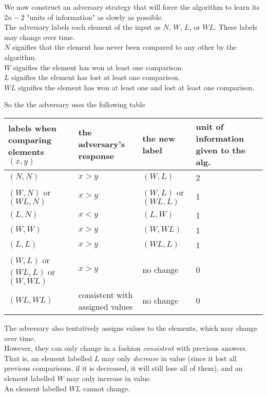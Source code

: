 \documentclass[12pt]{article}
\theoremstyle{plain}
\theoremstyle{definition}
\newcommand{\lecture}[1]{\marginpar{{\footnotesize $\leftarrow$ \underline{#1}}}}
\begin{document}
We now construct an adversary strategy that will force the algorithm to learn its $2n-2$ "units of information" as slowly as possible. \\
The adversary labels each element of the input as $N$, $W$, $L$, or $WL$.
These labels may change over time. \\
$N$ signifies that the element has never been compared to any other by the algorithm. \\
$W$ signifies the element has won at least one comparison. \\
$L$ signifies the element has lost at least one comparison. \\
$WL$ signifies the element has won at least one and lost at least one comparison. \\

\lecture{October 27, 2016}

So the the adversary uses the following table
\begin{table}[h]
  \centering
  \begin{tabular}{C{3cm}  C{3cm}  C{3cm}  C{3cm}}
  \hline
  labels when comparing elements $(x, y)$ & the adversary's response & the new label & unit of information given to the alg. \\ \hline
  $(N, N)$ & $x > y$ & $(W, L)$ & 2 \\
  $(W, N)$ or $(WL, N)$ & $x > y$ & $(W, L)$ or $(WL, L)$ & 1 \\
  $(L, N)$ & $x < y$ & $(L, W)$ & 1 \\
  $(W, W)$ & $x > y$ & $(W, WL)$ & 1 \\
  $(L, L)$ & $x > y$ & $(WL, L)$ & 1 \\
  $(W, L)$ or $(WL, L)$ or $(W, WL)$ & $x > y$ & no change & 0 \\
  $(WL, WL)$ & consistent with assigned values & no change & 0 \\ \hline
  \end{tabular}
\end{table}
The adversary also tentatively assigns values to the elements, which may change over time. \\
However, they can only change in a fashion \emph{consistent} with previous answers.
That is, an element labelled $L$ may only \emph{decrease} in value (since it lost all previous comparisons, if it is decreased, it will still lose all of them), and an element labelled $W$ may only increase in value. \\
An element labelled $WL$ cannot change. \\
\end{document}
